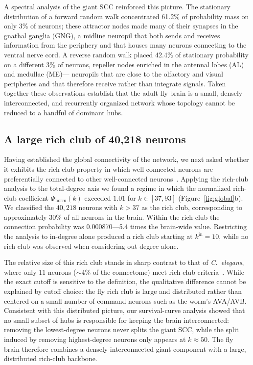 \documentclass[11pt]{article}
\begin{document}
A spectral analysis of the giant SCC reinforced this picture. The
stationary distribution of a forward random walk concentrated 61.2\% of
probability mass on only 3\% of neurons; these attractor nodes made many
of their synapses in the gnathal ganglia (GNG), a midline neuropil that
both sends and receives information from the periphery and that houses
many neurons connecting to the ventral nerve cord. A reverse random walk
placed 42.4\% of stationary probability on a different 3\% of neurons,
repeller nodes enriched in the antennal lobes (AL) and medullae (ME)---
neuropils that are close to the olfactory and visual peripheries and that
therefore receive rather than integrate signals. Taken together these
observations establish that the adult fly brain is a small, densely
interconnected, and recurrently organized network whose topology cannot be
reduced to a handful of dominant hubs.

\subsection{A large rich club of 40{,}218 neurons}

Having established the global connectivity of the network, we next asked
whether it exhibits the rich-club property in which well-connected neurons
are preferentially connected to other well-connected
neurons~\cite{colizza2006detecting,vandenheuvel2011rich}. Applying the
rich-club analysis to the total-degree axis we found a regime in which the
normalized rich-club coefficient $\Phi_{\mathrm{norm}}(k)$ exceeded
$1.01$ for $k \in [37, 93]$ (Figure~\ref{fig:global}b). We classified the
$40{,}218$ neurons with $k > 37$ as the rich club, corresponding to
approximately 30\% of all neurons in the brain. Within the rich club the
connection probability was $0.000870$---5.4 times the brain-wide value.
Restricting the analysis to in-degree alone produced a rich club starting
at $k^{\text{in}} = 10$, while no rich club was observed when considering
out-degree alone.

The relative size of this rich club stands in sharp contrast to that of
\textit{C.\ elegans}, where only 11 neurons ($\sim 4\%$ of the
connectome) meet rich-club criteria~\cite{towlson2013rich}. While the
exact cutoff is sensitive to the definition, the qualitative difference
cannot be explained by cutoff choice: the fly rich club is large and
distributed rather than centered on a small number of command neurons such
as the worm's AVA/AVB. Consistent with this distributed picture, our
survival-curve analysis showed that no small subset of hubs is
responsible for keeping the brain interconnected: removing the lowest-degree
neurons never splits the giant SCC, while the split induced by removing
highest-degree neurons only appears at $k \approx 50$. The fly brain
therefore combines a densely interconnected giant component with a large,
distributed rich-club backbone.
\end{document}
